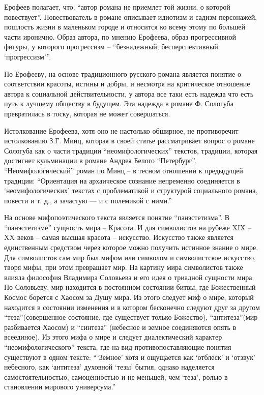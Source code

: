 \documentclass[12pt,a4paper]{article}
\begin{document}
Ерофеев полагает, что: \enquote{автор романа не приемлет той жизни, о которой повествует}. Повествователь в романе описывает идиотизм и садизм персонажей, пошлость жизни в маленьком городе и относится ко всему этому по большей части иронично. Образ автора, по мнению Ерофеева, образ прогрессивной фигуры, у которого прогрессизм -- \enquote{безнадежный, бесперспективный \enquote{прогрессизм}}. \parencite[146.]{jerofeev1985}

По Ерофееву, на основе традиционного русского романа является понятие о соответствии красоты, истины и добры, и несмотря на критическое отношение автора к социальной действительности, у автора все таки есть надежда что есть путь к лучшему обществу в будущем. Эта надежда в романе Ф. Сологуба превратилась в тоску, которая не может совершаться.  \parencite[158.]{jerofeev1985}


Истолкование Ерофеева, хотя оно не настолько обширное, не противоречит истолкованию З.Г. Минц, которая в  своей статье  \parencite*{mints2004} рассматривает вопрос о романе Сологуба как о части традиции \enquote{неомифологических} текстов, традиции, которая достигнет кульминации в романе Андрея Белого \enquote{Петербург}. \enquote{Неомифологический} роман по Минц -- в тесном отношении к предыдущей традиции: \enquote{Ориентация на архаическое сознание непременно соединяется в \enquote{неомифологических} текстах с проблематикой и структурой социального романа, повести и т. д., а зачастую — и с полемикой с ними.} \parencite[60.]{mints2004} 

На основе мифопоэтического текста является понятие \enquote{панэстетизма}. В \enquote{панэстетизме} сущность мира -- Красота. И для символистов на рубеже XIX -- XX веков -- самая высшая красота -- искусство. Искусство также является единственным средством через которое можно получить истинное знание о мире. Для символистов сам мир был мифом или символом и символистское искусство, творя мифы, при этом превращает мир. На картину мира символистов также влияла философия Владимира Соловьева и его идея о триадной сущности мира. По Соловьеву, мир находится в постоянном состоянии битвы, где Божественный Космос борется с Хаосом за Душу мира. Из этого следует миф о мире, который находится в состоянии изменения и в котором бесконечно следуют друг за другом \enquote{теза}(совершенное состояние, где существует только Божество), \enquote{антитеза}(мир разбивается Хаосом) и  \enquote{синтеза} (небесное и земное соединяются опять в всеединое). Из этого мифа о мире и следует диалектический характер \enquote{неомифологического} текста, где на вид противопоставляющие понятия существуют в одном тексте: \enquote{\enquote{Земное} хотя и ощущается как \enquote{отблеск} и \enquote{отзвук} небесного, как \enquote{антитеза} духовной \enquote{тезы} бытия, однако наделяется самостоятельностью, самоценностью и не меньшей, чем \enquote{теза}, ролью в становлении мирового универсума.} \parencite[71.]{mints2004}
\end{document}
